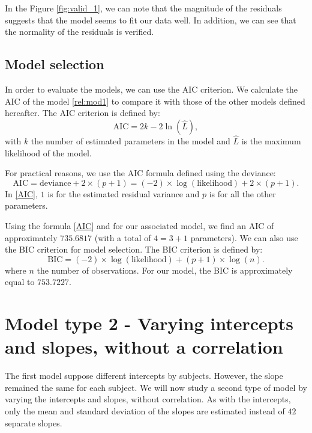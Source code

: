 \documentclass{article}
\newcommand*{\AIC}{\mathrm{AIC}}
\newcommand*{\BIC}{\mathrm{BIC}}
\begin{document}
In the Figure \ref{fig:valid_1}, we can note that the magnitude of the residuals suggests that the model seems to fit our data well. In addition, we can see that the normality of the residuals is verified.

\subsection{Model selection}
In order to evaluate the models, we can use the AIC criterion.
We calculate the AIC of the model \eqref{rel:mod1} to compare it with those of the other models defined hereafter. The AIC criterion is defined by:
\[ \AIC = 2k - 2\ln({\hat{L}}),\]
with  $k$ the number of estimated parameters in the model and $\hat{L}$ is the maximum likelihood of the model.


For practical reasons, we use the AIC formula defined using the deviance:
\begin{equation}
    \AIC=\text{deviance} + 2 \times (p+1)=(-2) \times \log(\text{likelihood}) + 2 \times (p+1).\label{AIC}
\end{equation}
In \eqref{AIC}, $1$ is for the estimated residual variance and $p$ is for all the other parameters.


Using the formula \eqref{AIC} and for our associated model, we find an AIC of approximately $735.6817$ (with a total of $4=3+1$ parameters).
We can also use the BIC criterion for model selection. The BIC criterion is defined by:
\begin{equation}
    \BIC= (-2) \times \log(\text{likelihood}) + (p+1) \times \log(n).\label{BIC}
\end{equation}
where $n$ the number of observations.
For our model, the BIC is approximately equal to $753.7227$.


\section{Model type 2 - Varying intercepts and slopes, without a correlation}

The first model suppose different intercepts by subjects. However, the slope remained the same for each subject. We will now study a second type of model by varying the intercepts and slopes, without correlation. 
As with the intercepts, only the mean and standard deviation of the slopes are estimated instead of $42$ separate slopes.
\end{document}
